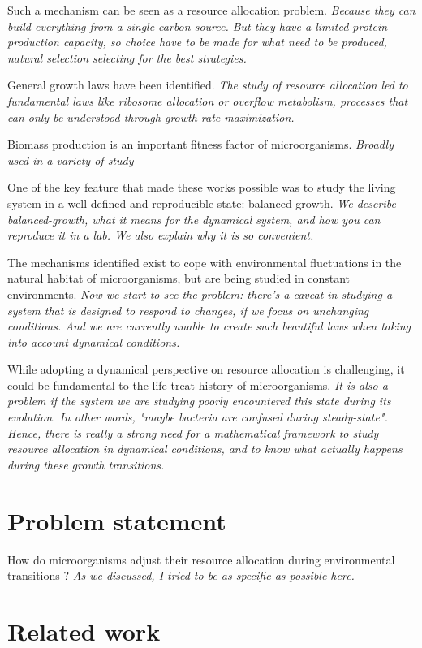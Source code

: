 Such a mechanism can be seen as a resource allocation problem.
\textit{Because they can build everything from a single carbon source.
But they have a limited protein production capacity, so choice have to be made for what need to be produced, natural selection selecting for the best strategies.}

General growth laws have been identified.
\textit{The study of resource allocation led to fundamental laws like ribosome allocation or overflow metabolism, processes that can only be understood through growth rate maximization.}

Biomass production is an important fitness factor of microorganisms.
\textit{Broadly used in a variety of study}

One of the key feature that made these works possible was to study the living system in a well-defined and reproducible state: balanced-growth.
\textit{We describe balanced-growth, what it means for the dynamical system, and how you can reproduce it in a lab.
We also explain why it is so convenient.}

The mechanisms identified exist to cope with environmental fluctuations in the natural habitat of microorganisms, but are being studied in constant environments.
\textit{Now we start to see the problem: there's a caveat in studying a system that is designed to respond to changes, if we focus on unchanging conditions.
And we are currently unable to create such beautiful laws when taking into account dynamical conditions.}

While adopting a dynamical perspective on resource allocation is challenging, it could be fundamental to the life-treat-history of microorganisms.
\textit{It is also a problem if the system we are studying poorly encountered this state during its evolution.
In other words, "maybe bacteria are confused during steady-state".
Hence, there is really a strong need for a mathematical framework to study resource allocation in dynamical conditions, and to know what actually happens during these growth transitions.}

\section{Problem statement}

How do microorganisms adjust their resource allocation during environmental transitions ?
\textit{As we discussed, I tried to be as specific as possible here.}

\section{Related work}

